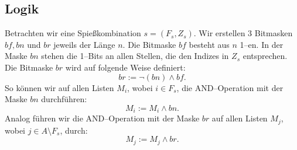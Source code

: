 \subsection{Logik}

Betrachten wir eine Spießkombination $s = (F_s, Z_s)$.
Wir erstellen 3 Bitmasken $bf, bn$ und $br$ jeweils der Länge $n$.
Die Bitmaske $bf$ besteht aus $n$ 1--en.
In der Maske $bn$ stehen die 1--Bits an allen Stellen, die den Indizes in $Z_s$ entsprechen.
Die Bitmaske $br$ wird auf folgende Weise definiert:
\[
br := \neg(bn) \land bf.
\]
\noindent So können wir auf allen Listen $M_i$, wobei $i \in F_s$, die AND--Operation mit der Maske $bn$ 
durchführen:
\[
M_i := M_i \land bn.
\]
Analog führen wir die AND--Operation mit der Maske $br$ auf allen Listen $M_j$,
wobei $j \in A \setminus F_s$, durch:
\[
M_j := M_j \land br.
\]

